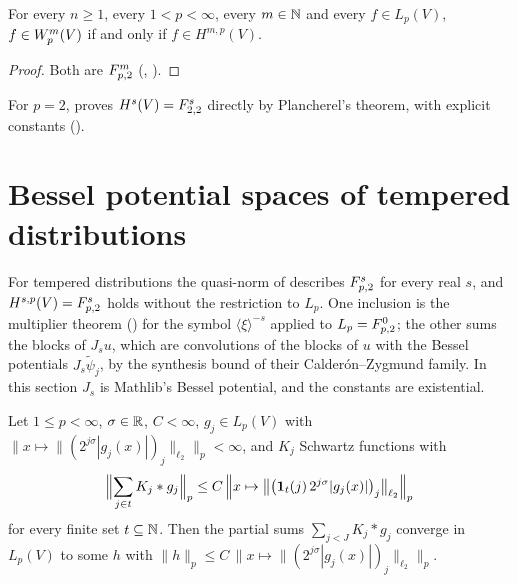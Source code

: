 \begin{corollary}[$\Sob{m}{p} = H^{m,p}$]
\label{cor:sobolev-bessel}
\leanok
{}
For every $n \geq 1$, every $1 < p < \infty$, every $m \in \mathbb{N}$ and every $f \in L_p(V)$,
$f \in W^{m}_{p}(V)$ if and only if $f \in H^{m,p}(V)$.
\end{corollary}

\begin{proof}
\leanok
Both are $F^{m}_{p,2}$ (,
).
\end{proof}

For $p = 2$,  proves $H^s(V) = F^{s}_{2,2}$ directly by
Plancherel's theorem, with explicit constants ().

\section{Bessel potential spaces of tempered distributions}
\label{sec:bessel-potential-distributions}

For tempered distributions the quasi-norm of  describes $F^{s}_{p,2}$ for
every real $s$, and $H^{s,p}(V) = F^{s}_{p,2}$ holds without the restriction to $L_p$. One
inclusion is the multiplier theorem () for the symbol
$\langle \xi \rangle^{-s}$ applied to $L_p = F^{0}_{p,2}$; the other sums the blocks of $J_s u$,
which are convolutions of the blocks of $u$ with the Bessel potentials $J_s \tilde\psi_j$, by the
synthesis bound of their Calder\'on--Zygmund family. In this section $J_s$ is Mathlib's Bessel
potential, and the constants are existential.

\begin{lemma}
\label{lem:synthesis-sums-lp-families}
\leanok
{}
Let $1 \leq p < \infty$, $\sigma \in \mathbb{R}$, $C < \infty$, $g_j \in L_p(V)$ with
$\| x \mapsto \| (2^{j\sigma} |g_j(x)|)_j \|_{\ell_2} \|_p < \infty$, and $K_j$ Schwartz functions
with
\[
  \Bigl\| \sum_{j \in t} K_j * g_j \Bigr\|_p \leq C \, \Bigl\| x \mapsto \bigl\|
  \bigl(\mathbf 1_t(j) \, 2^{j\sigma} |g_j(x)|\bigr)_j \bigr\|_{\ell_2} \Bigr\|_p
\]
for every finite set $t \subseteq \mathbb{N}$. Then the partial sums $\sum_{j < J} K_j * g_j$ converge in
$L_p(V)$ to some $h$ with
$\|h\|_p \leq C \, \| x \mapsto \| (2^{j\sigma} |g_j(x)|)_j \|_{\ell_2} \|_p$.
\end{lemma}

